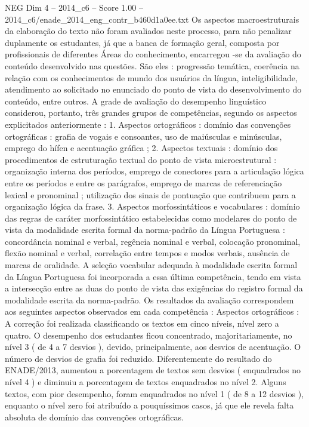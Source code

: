 \begin{textsample}{NEG Dim 4 – 2014\_c6 – Score 1.00 – 2014\_c6/enade\_2014\_eng\_contr\_b460d1a0ee.txt}
Os aspectos macroestruturais da elaboração do texto não foram avaliados neste processo, para não penalizar duplamente os estudantes, já que a banca de formação geral, composta por profissionais de diferentes Áreas do conhecimento, encarregou -se da avaliação do conteúdo desenvolvido nas questões.
São eles : progressão temática, coerência na relação com os conhecimentos de mundo dos usuários da língua, inteligibilidade, atendimento ao solicitado no enunciado do ponto de vista do desenvolvimento do conteúdo, entre outros.
A grade de avaliação do desempenho linguístico considerou, portanto, três grandes grupos de competências, segundo os aspectos explicitados anteriormente : 1.
Aspectos ortográficos : domínio das convenções ortográficas : grafia de vogais e consoantes, uso de maiúsculas e minúsculas, emprego do hífen e acentuação gráfica ; 2.
Aspectos textuais : domínio dos procedimentos de estruturação textual do ponto de vista microestrutural : organização interna dos períodos, emprego de conectores para a articulação lógica entre os períodos e entre os parágrafos, emprego de marcas de referenciação lexical e pronominal ; utilização dos sinais de pontuação que contribuem para a organização lógica da frase. 3.
Aspectos morfossintáticos e vocabulares : domínio das regras de caráter morfossintático estabelecidas como modelares do ponto de vista da modalidade escrita formal da norma-padrão da Língua Portuguesa : concordância nominal e verbal, regência nominal e verbal, colocação pronominal, flexão nominal e verbal, correlação entre tempos e modos verbais, ausência de marcas de oralidade.
A seleção vocabular adequada à modalidade escrita formal da Língua Portuguesa foi incorporada a essa última competência, tendo em vista a intersecção entre as duas do ponto de vista das exigências do registro formal da modalidade escrita da norma-padrão.
Os resultados da avaliação correspondem aos seguintes aspectos observados em cada competência : Aspectos ortográficos : A correção foi realizada classificando os textos em cinco níveis, nível zero a quatro.
O desempenho dos estudantes ficou concentrado, majoritariamente, no nível 3 ( de 4 a 7 desvios ), devido, principalmente, aos desvios de acentuação.
O número de desvios de grafia foi reduzido.
Diferentemente do resultado do ENADE/2013, aumentou a porcentagem de textos sem desvios ( enquadrados no nível 4 ) e diminuiu a porcentagem de textos enquadrados no nível 2.
Alguns textos, com pior desempenho, foram enquadrados no nível 1 ( de 8 a 12 desvios ), enquanto o nível zero foi atribuído a pouquíssimos casos, já que ele revela falta absoluta de domínio das convenções ortográficas.

\end{textsample}
